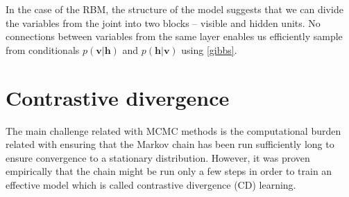 In the case of the RBM, the structure of the model suggests that we can divide the variables from the joint into two blocks -- visible and hidden units. No connections between variables from the same layer enables us efficiently sample from conditionals $p(\mathbf{v}| \mathbf{h})$ and $p(\mathbf{h} | \mathbf{v})$ using \ref{gibbs}.
    
\section{Contrastive divergence}
The main challenge related with MCMC methods is the computational burden related with ensuring that the Markov chain has been run sufficiently long to ensure convergence to a stationary distribution. However, it was proven empirically that the chain might be run only a few steps in order to train an effective model \cite{hinton2002training} which is called contrastive divergence (CD) learning. 
 
